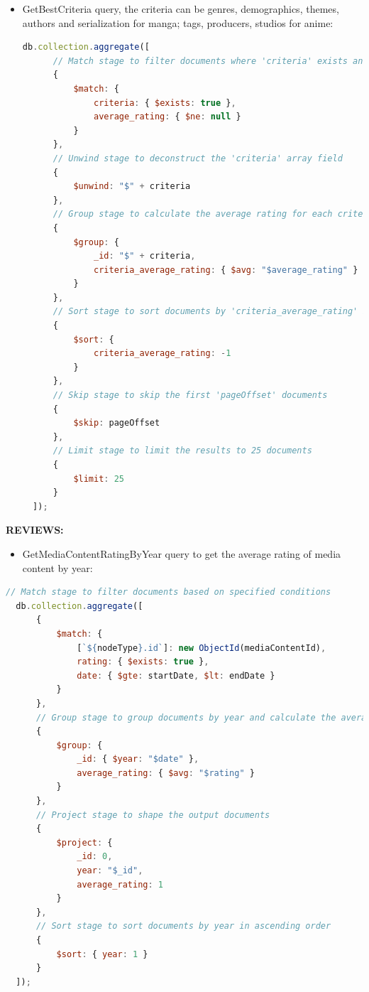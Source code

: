 \begin{itemize}

\item GetBestCriteria query, the criteria can be genres, demographics, themes, authors and serialization for manga; tags, producers, studios for anime:
\begin{lstlisting}[language=JavaScript, caption=get best criteria]
  db.collection.aggregate([
      // Match stage to filter documents where 'criteria' exists and 'average_rating' is not null
      {
          $match: {
              criteria: { $exists: true },
              average_rating: { $ne: null }
          }
      },
      // Unwind stage to deconstruct the 'criteria' array field
      {
          $unwind: "$" + criteria
      },
      // Group stage to calculate the average rating for each criteria
      {
          $group: {
              _id: "$" + criteria,
              criteria_average_rating: { $avg: "$average_rating" }
          }
      },
      // Sort stage to sort documents by 'criteria_average_rating' in descending order
      {
          $sort: {
              criteria_average_rating: -1
          }
      },
      // Skip stage to skip the first 'pageOffset' documents
      {
          $skip: pageOffset
      },
      // Limit stage to limit the results to 25 documents
      {
          $limit: 25
      }
  ]);
  \end{lstlisting}

\end{itemize}

\textbf{REVIEWS:}

\begin{itemize}
\item GetMediaContentRatingByYear query to get the average rating of media content by year:
\end{itemize}
\begin{lstlisting}[language=JavaScript, caption=Query per db.collection.aggregate]
  // Match stage to filter documents based on specified conditions
  db.collection.aggregate([
      {
          $match: {
              [`${nodeType}.id`]: new ObjectId(mediaContentId),
              rating: { $exists: true },
              date: { $gte: startDate, $lt: endDate }
          }
      },
      // Group stage to group documents by year and calculate the average rating
      {
          $group: {
              _id: { $year: "$date" },
              average_rating: { $avg: "$rating" }
          }
      },
      // Project stage to shape the output documents
      {
          $project: {
              _id: 0,
              year: "$_id",
              average_rating: 1
          }
      },
      // Sort stage to sort documents by year in ascending order
      {
          $sort: { year: 1 }
      }
  ]);
  \end{lstlisting}




